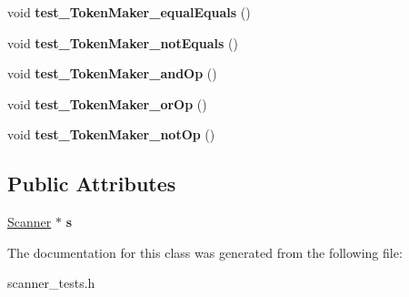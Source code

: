 \begin{DoxyCompactItemize}
\item 
\hypertarget{classScannerTestSuite_a5a591c0c62d905129744f660ca74149d}{void {\bfseries test\-\_\-\-Token\-Maker\-\_\-equal\-Equals} ()}\label{classScannerTestSuite_a5a591c0c62d905129744f660ca74149d}

\item 
\hypertarget{classScannerTestSuite_a9ee2f76c0deeb7b0c99d1be5d895c46f}{void {\bfseries test\-\_\-\-Token\-Maker\-\_\-not\-Equals} ()}\label{classScannerTestSuite_a9ee2f76c0deeb7b0c99d1be5d895c46f}

\item 
\hypertarget{classScannerTestSuite_aa71ec0de76c1afa02ff6468f60fc188f}{void {\bfseries test\-\_\-\-Token\-Maker\-\_\-and\-Op} ()}\label{classScannerTestSuite_aa71ec0de76c1afa02ff6468f60fc188f}

\item 
\hypertarget{classScannerTestSuite_a79743fed40c2a7e325dab1804c6a863b}{void {\bfseries test\-\_\-\-Token\-Maker\-\_\-or\-Op} ()}\label{classScannerTestSuite_a79743fed40c2a7e325dab1804c6a863b}

\item 
\hypertarget{classScannerTestSuite_ade8c573d5c330cdedca37d3dc61220a7}{void {\bfseries test\-\_\-\-Token\-Maker\-\_\-not\-Op} ()}\label{classScannerTestSuite_ade8c573d5c330cdedca37d3dc61220a7}

\end{DoxyCompactItemize}
\subsection*{Public Attributes}
\begin{DoxyCompactItemize}
\item 
\hypertarget{classScannerTestSuite_a39987f3459098101d7c7fb5a4492996d}{\hyperlink{classScanner}{Scanner} $\ast$ {\bfseries s}}\label{classScannerTestSuite_a39987f3459098101d7c7fb5a4492996d}

\end{DoxyCompactItemize}


The documentation for this class was generated from the following file\-:\begin{DoxyCompactItemize}
\item 
scanner\-\_\-tests.\-h\end{DoxyCompactItemize}
